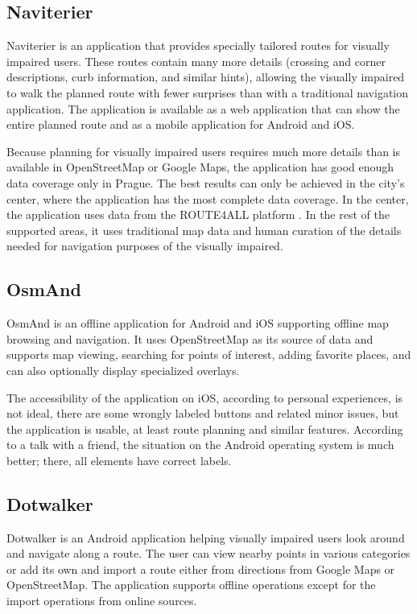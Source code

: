\documentclass[nolof,digital]{fithesis3}
\begin{document}
\subsection{Naviterier}
Naviterier \parencite{naviterier} is an application that provides specially tailored routes for visually impaired users. These routes contain many more details (crossing and corner descriptions, curb information, and similar hints), allowing the visually impaired to walk the planned route with fewer surprises than with a traditional navigation application. The application is available as a web application that can show the entire planned route and as a mobile application for Android and iOS.

Because planning for visually impaired users requires much more details than is available in OpenStreetMap or Google Maps, the application has good enough data coverage only in Prague. The best results can only be achieved in the city's center, where the application has the most complete data coverage. In the center, the application uses data from the ROUTE4ALL platform \parencite{route4all}. In the rest of the supported areas, it uses traditional map data and human curation of the details needed for navigation purposes of the visually impaired.
\subsection{OsmAnd}
OsmAnd \parencite{osmand} is an offline application for Android and iOS supporting offline map browsing and navigation. It uses OpenStreetMap as its source of data and supports map viewing, searching for points of interest, adding favorite places, and can also optionally display specialized overlays.

The accessibility of the application on iOS, according to personal experiences, is not ideal, there are some wrongly labeled buttons and related minor issues, but the application is usable, at least route planning and similar features. According to a talk with a friend, the situation on the Android operating system is much better; there, all elements have correct labels.
\subsection{Dotwalker}
Dotwalker \parencite{dotwalker} is an Android application helping visually impaired users look around and navigate along a route. The user can view nearby points in various categories or add its own and import a route either from directions from Google Maps or OpenStreetMap. The application supports offline operations except for the import operations from online sources.
\end{document}
